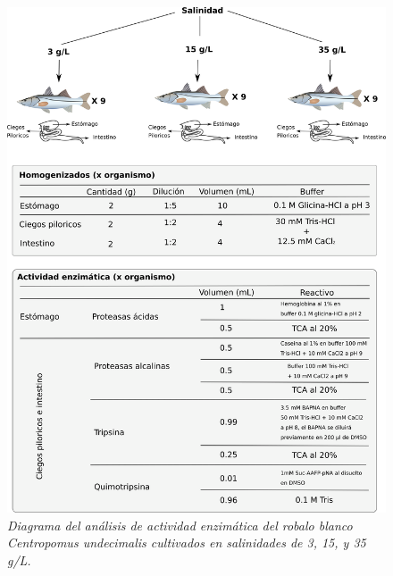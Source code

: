 \documentclass[12pt,a4paper]{article}
\begin{document}
\begin{figure}[h]
	\begin{leftbar}
		
		\includegraphics[width=\textwidth]{ejercicio.png}
		\centering
		\caption{\textit{Diagrama del an\'alisis de actividad enzim\'atica del robalo blanco \textit{Centropomus undecimalis} cultivados en salinidades de 3, 15, y 35 g/L.}}
		\label{fig:ejercicio}
		
	\end{leftbar}
	
\end{figure}
\end{document}
